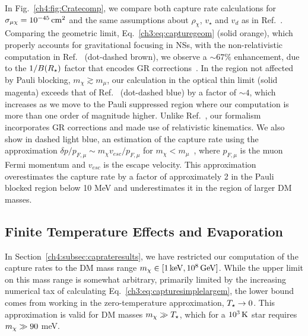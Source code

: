 In Fig.~\ref{ch4:fig:Cratecomp}, we compare both capture rate calculations for  $\sigma_{\mu\chi}=10^{-45}{\rm \,cm}^2$ and the same assumptions about $\rho_\chi$, $v_\star$ and $v_d$ as in Ref.~\cite{Garani:2018kkd_may_NewAnalysisNeutron}. Comparing the geometric limit, Eq.~\ref{ch3:eq:capturegeom}  (solid orange), which properly accounts for gravitational focusing in NSs, with the non-relativistic computation in Ref.~\cite{Garani:2018kkd_may_NewAnalysisNeutron} (dot-dashed brown), we observe a $\sim 67 \%$ enhancement, due to the $1/B(R_\star)$ factor that encodes GR corrections~\cite{Goldman:1989nd_WeaklyInteractingMassive,Kouvaris:2007ay_WIMPAnnihilationCooling}. 
In the region not affected by Pauli blocking, $m_\chi \gtrsim m_\mu$, our calculation in the optical thin limit (solid magenta) exceeds that of Ref.~\cite{Garani:2018kkd_may_NewAnalysisNeutron} (dot-dashed blue) by a factor of $\sim 4$, which increases as we move to the Pauli suppressed region where our computation is more than one order of magnitude higher. Unlike Ref.~\cite{Garani:2018kkd_may_NewAnalysisNeutron}, our formalism incorporates GR corrections and made use of relativistic kinematics. We also show in dashed light blue, an estimation of the capture rate using the approximation $\delta p/p_{F,\mu}\sim m_\chi v_{esc}/p_{F,\mu}$  for $m_\chi < m_\mu$~\cite{McDermott:2011jp_ConstraintsScalarAsymmetric}, where $p_{F,\mu}$ is the muon Fermi momentum and $v_{esc}$ is the escape velocity. This approximation overestimates the capture rate by a factor of approximately 2 in the Pauli blocked region below 10 MeV and underestimates it in the region of larger DM masses. 





\subsection{Finite Temperature Effects and Evaporation}
\label{ch4:subsec:finite_temp_NS}



In Section~\ref{ch4:subsec:caprateresults}, we have restricted our computation of the capture rates to the DM mass range $m_\chi\in[1{\rm \,keV},10^8{\rm \,GeV}]$. While the upper limit on this mass range is somewhat arbitrary, primarily limited by the increasing numerical tax of calculating Eq.~\ref{ch3:eq:capturesimplelargem}, the lower bound comes from working in the zero-temperature approximation, $T_\star \rightarrow 0$. This approximation is valid for DM masses $m_\chi \gg T_\star$, which for a $10^3{\rm \,K}$ star requires $m_\chi \gg 90$ meV.

